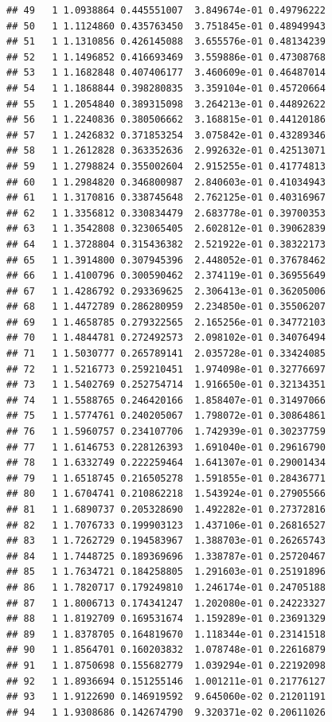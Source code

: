\documentclass[article]{jss}\usepackage[]{graphicx}\usepackage[]{xcolor}
\makeatletter
\newenvironment{kframe}{%
 \def\at@end@of@kframe{}%
 \ifinner\ifhmode%
  \def\at@end@of@kframe{\end{minipage}}%
  \begin{minipage}{\columnwidth}%
 \fi\fi%
 \def\FrameCommand##1{\hskip\@totalleftmargin \hskip-\fboxsep
 \colorbox{shadecolor}{##1}\hskip-\fboxsep
     \hskip-\linewidth \hskip-\@totalleftmargin \hskip\columnwidth}%
 \MakeFramed {\advance\hsize-\width
   \@totalleftmargin\z@ \linewidth\hsize
   \@setminipage}}%
 {\par\unskip\endMakeFramed%
 \at@end@of@kframe}
\newenvironment{knitrout}{}{} %
\makeatother
\begin{document}
\begin{knitrout}
\begin{kframe}
\begin{verbatim}
## 49   1 1.0938864 0.445551007  3.849674e-01 0.49796222
## 50   1 1.1124860 0.435763450  3.751845e-01 0.48949943
## 51   1 1.1310856 0.426145088  3.655576e-01 0.48134239
## 52   1 1.1496852 0.416693469  3.559886e-01 0.47308768
## 53   1 1.1682848 0.407406177  3.460609e-01 0.46487014
## 54   1 1.1868844 0.398280835  3.359104e-01 0.45720664
## 55   1 1.2054840 0.389315098  3.264213e-01 0.44892622
## 56   1 1.2240836 0.380506662  3.168815e-01 0.44120186
## 57   1 1.2426832 0.371853254  3.075842e-01 0.43289346
## 58   1 1.2612828 0.363352636  2.992632e-01 0.42513071
## 59   1 1.2798824 0.355002604  2.915255e-01 0.41774813
## 60   1 1.2984820 0.346800987  2.840603e-01 0.41034943
## 61   1 1.3170816 0.338745648  2.762125e-01 0.40316967
## 62   1 1.3356812 0.330834479  2.683778e-01 0.39700353
## 63   1 1.3542808 0.323065405  2.602812e-01 0.39062839
## 64   1 1.3728804 0.315436382  2.521922e-01 0.38322173
## 65   1 1.3914800 0.307945396  2.448052e-01 0.37678462
## 66   1 1.4100796 0.300590462  2.374119e-01 0.36955649
## 67   1 1.4286792 0.293369625  2.306413e-01 0.36205006
## 68   1 1.4472789 0.286280959  2.234850e-01 0.35506207
## 69   1 1.4658785 0.279322565  2.165256e-01 0.34772103
## 70   1 1.4844781 0.272492573  2.098102e-01 0.34076494
## 71   1 1.5030777 0.265789141  2.035728e-01 0.33424085
## 72   1 1.5216773 0.259210451  1.974098e-01 0.32776697
## 73   1 1.5402769 0.252754714  1.916650e-01 0.32134351
## 74   1 1.5588765 0.246420166  1.858407e-01 0.31497066
## 75   1 1.5774761 0.240205067  1.798072e-01 0.30864861
## 76   1 1.5960757 0.234107706  1.742939e-01 0.30237759
## 77   1 1.6146753 0.228126393  1.691040e-01 0.29616790
## 78   1 1.6332749 0.222259464  1.641307e-01 0.29001434
## 79   1 1.6518745 0.216505278  1.591855e-01 0.28436771
## 80   1 1.6704741 0.210862218  1.543924e-01 0.27905566
## 81   1 1.6890737 0.205328690  1.492282e-01 0.27372816
## 82   1 1.7076733 0.199903123  1.437106e-01 0.26816527
## 83   1 1.7262729 0.194583967  1.388703e-01 0.26265743
## 84   1 1.7448725 0.189369696  1.338787e-01 0.25720467
## 85   1 1.7634721 0.184258805  1.291603e-01 0.25191896
## 86   1 1.7820717 0.179249810  1.246174e-01 0.24705188
## 87   1 1.8006713 0.174341247  1.202080e-01 0.24223327
## 88   1 1.8192709 0.169531674  1.159289e-01 0.23691329
## 89   1 1.8378705 0.164819670  1.118344e-01 0.23141518
## 90   1 1.8564701 0.160203832  1.078748e-01 0.22616879
## 91   1 1.8750698 0.155682779  1.039294e-01 0.22192098
## 92   1 1.8936694 0.151255146  1.001211e-01 0.21776127
## 93   1 1.9122690 0.146919592  9.645060e-02 0.21201191
## 94   1 1.9308686 0.142674790  9.320371e-02 0.20611026

\end{verbatim}
\end{kframe}
\end{knitrout}
\end{document}
